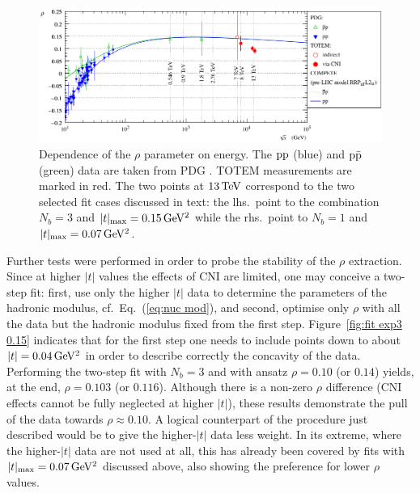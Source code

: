 \begin{figure}
\begin{center}
\includegraphics{fig/rho_vs_s.pdf}
\caption{%
Dependence of the $\rho$ parameter on energy. The $\rm pp$ (blue) and $\rm p\bar p$ (green) data are taken from PDG \cite{pdg-2010}. TOTEM measurements are marked in red. The two points at $13\,{\rm TeV}$ correspond to the two selected fit cases discussed in text: the lhs.~point to the combination $N_b = 3$ and $|t|_{\rm max} = 0.15\,{\rm GeV^2}$ while the rhs.~point to $N_b = 1$ and $|t|_{\rm max} = 0.07\,{\rm GeV^2}$.
}
\label{fig:rho_vs_s}
\end{center}
\end{figure}

Further tests were performed in order to probe the stability of the $\rho$ extraction. Since at higher $|t|$ values the effects of CNI are limited, one may conceive a two-step fit: first, use only the higher $|t|$ data to determine the parameters of the hadronic modulus, cf.~Eq.~(\ref{eq:nuc mod}), and second, optimise only $\rho$ with all the data but the hadronic modulus fixed from the first step. Figure~\ref{fig:fit exp3 0.15} indicates that for the first step one needs to include points down to about $|t| = 0.04\,{\rm GeV^2}$ in order to describe correctly the concavity of the data. Performing the two-step fit with $N_b=3$ and with ansatz $\rho = 0.10$ (or $0.14$) yields, at the end, $\rho = 0.103$ (or $0.116$). Although there is a non-zero $\rho$ difference (CNI effects cannot be fully neglected at higher $|t|$), these results demonstrate the pull of the data towards $\rho \approx 0.10$. A logical counterpart of the procedure just described would be to give the higher-$|t|$ data less weight. In its extreme, where the higher-$|t|$ data are not used at all, this has already been covered by fits with $|t|_{\rm max} = 0.07\,{\rm GeV^2}$ discussed above, also showing the preference for lower $\rho$ values.

